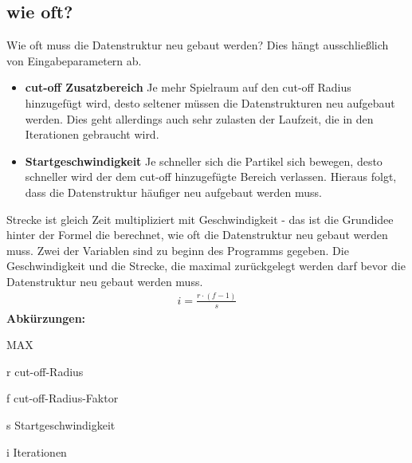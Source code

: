 \documentclass[
	12pt,
	a4paper,
	BCOR10mm,
	DIV14,
	headsepline,
]{scrreprt}
\begin{document}
\subsection{wie oft?}
	 Wie oft muss die Datenstruktur neu gebaut werden? Dies hängt ausschließlich von Eingabeparametern ab.
	\begin{itemize}
		\item \textbf{cut-off Zusatzbereich} Je mehr Spielraum auf den cut-off Radius hinzugefügt wird, desto seltener müssen die Datenstrukturen neu aufgebaut werden. Dies geht allerdings auch sehr zulasten der Laufzeit, die in den Iterationen gebraucht wird.
		\item \textbf{Startgeschwindigkeit} Je schneller sich die Partikel sich bewegen, desto schneller wird der dem cut-off hinzugefügte Bereich verlassen. Hieraus folgt, dass die Datenstruktur häufiger neu aufgebaut werden muss.
	\end{itemize}
	Strecke ist gleich Zeit multipliziert mit Geschwindigkeit - das ist die Grundidee hinter der Formel die berechnet, wie oft die Datenstruktur neu gebaut werden muss. Zwei der Variablen sind zu beginn des Programms gegeben. Die Geschwindigkeit und die Strecke, die maximal zurückgelegt werden darf bevor die Datenstruktur neu gebaut werden muss.
	\begin{align*}
		i=\frac{r \cdot (f - 1)}{s}
	\end{align*}
	\footnotesize\textbf{Abkürzungen:}\begin{labeling}[~--]{MAX}
		\item[r] cut-off-Radius
		\item[f] cut-off-Radius-Faktor
		\item[s] Startgeschwindigkeit
		\item[i] Iterationen
	\end{labeling}
\end{document}
